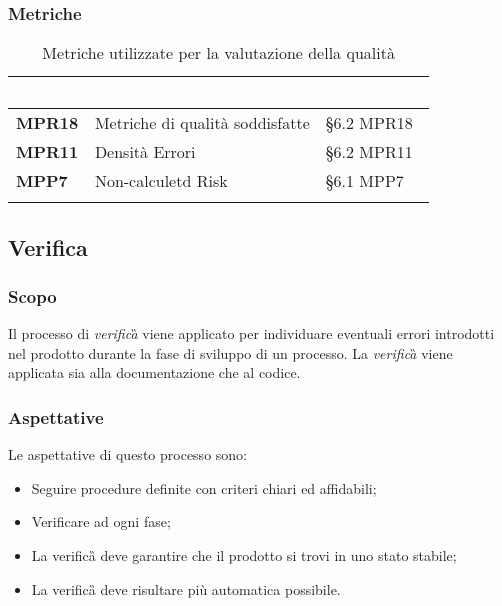 			\subsubsection{Metriche}
			\setlength{\freewidth}{\dimexpr\textwidth-0\tabcolsep}
			\renewcommand{\arraystretch}{1.5}
			\setlength{\aboverulesep}{0pt}
			\setlength{\belowrulesep}{0pt}
			\begin{longtable}{L{.22\freewidth} L{.4\freewidth} L{.2\freewidth}}
				\toprule
				\textcolor{white}{\textbf{Metrica}}&
				\textcolor{white}{\textbf{Descrizione}}&	
				\textcolor{white}{\textbf{Riferimento}}\\
				\toprule
				\endhead
				
				\textbf{MPR18} & Metriche di qualità soddisfatte & \S 6.2 MPR18 \\
				\textbf{MPR11} & Densità Errori & \S 6.2 MPR11 \\
				\textbf{MPP7} & Non-calculetd Risk & \S 6.1 MPP7 \\

				\bottomrule
				\caption{Metriche utilizzate per la valutazione della qualità}
			\end{longtable}
			
		
	
		\subsection{Verifica}
			\subsubsection{Scopo}
				Il processo di \emph{verifica}\G{} viene applicato per individuare eventuali errori introdotti nel prodotto durante la fase di sviluppo di un processo. La \emph{verifica}\G{} viene applicata sia alla documentazione che al codice. %
			\subsubsection{Aspettative}
				Le aspettative di questo processo sono:
					\begin{itemize}
						\item Seguire procedure definite con criteri chiari ed affidabili;
						\item Verificare ad ogni fase;
						\item La verifica\G{} deve garantire che il prodotto si trovi in uno stato stabile;
						\item La verifica\G{} deve risultare più automatica possibile.
					\end{itemize}
				
